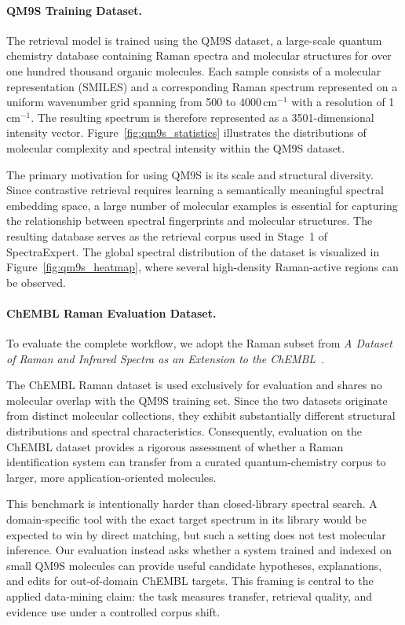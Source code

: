 \paragraph{QM9S Training Dataset.}

The retrieval model is trained using the QM9S dataset, a large-scale quantum chemistry database containing Raman spectra and molecular structures for over one hundred thousand organic molecules. Each sample consists of a molecular representation (SMILES) and a corresponding Raman spectrum represented on a uniform wavenumber grid spanning from 500 to 4000\,cm$^{-1}$ with a resolution of 1\,cm$^{-1}$. The resulting spectrum is therefore represented as a 3501-dimensional intensity vector. Figure~\ref{fig:qm9s_statistics} illustrates the distributions of molecular complexity and spectral intensity within the QM9S dataset.

The primary motivation for using QM9S is its scale and structural diversity. Since contrastive retrieval requires learning a semantically meaningful spectral embedding space, a large number of molecular examples is essential for capturing the relationship between spectral fingerprints and molecular structures. The resulting database serves as the retrieval corpus used in Stage~1 of SpectraExpert. The global spectral distribution of the dataset is visualized in Figure~\ref{fig:qm9s_heatmap}, where several high-density Raman-active regions can be observed.

\paragraph{ChEMBL Raman Evaluation Dataset.}

To evaluate the complete workflow, we adopt the Raman subset from \emph{A Dataset of Raman and Infrared Spectra as an Extension to the ChEMBL}~\cite{liang2025dataset}.

The ChEMBL Raman dataset is used exclusively for evaluation and shares no molecular overlap with the QM9S training set. Since the two datasets originate from distinct molecular collections, they exhibit substantially different structural distributions and spectral characteristics. Consequently, evaluation on the ChEMBL dataset provides a rigorous assessment of whether a Raman identification system can transfer from a curated quantum-chemistry corpus to larger, more application-oriented molecules.

This benchmark is intentionally harder than closed-library spectral search. A domain-specific tool with the exact target spectrum in its library would be expected to win by direct matching, but such a setting does not test molecular inference. Our evaluation instead asks whether a system trained and indexed on small QM9S molecules can provide useful candidate hypotheses, explanations, and edits for out-of-domain ChEMBL targets. This framing is central to the applied data-mining claim: the task measures transfer, retrieval quality, and evidence use under a controlled corpus shift.

